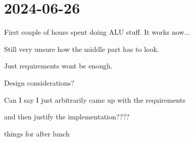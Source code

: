 \section{2024-06-26}

First couple of hours spent doing ALU stuff. It works now... 

Still very unsure how the middle part has to look. 

Just requirements wont be enough. 

Design considerations?

Can I say I just arbitrarily came up with the requirements

and then justify the implementation????


things for after lunch
